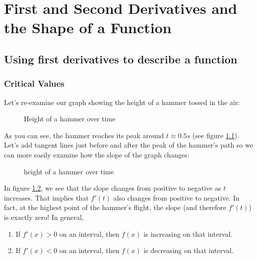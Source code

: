 \chapter{First and Second Derivatives and the Shape of a Function}
\section{Using first derivatives to describe a function}
\subsection{Critical Values}

Let's re-examine our graph showing the height of a hammer tossed in the air:


\begin{figure}
\centering
{}
\caption{Height of a hammer over time}
\label{ref:hammerh}
\end{figure}


As you can see, the hammer reaches its peak around $t \approx 0.5s$ (see figure \ref{ref:hammerh}). Let's add tangent lines just before and after the peak of the hammer's path so we can more easily examine how the slope of the graph changes:

\begin{figure}
\centering
{}
\caption{height of a hammer over time}
\label{ref:hammerh2}
\end{figure}


In figure \ref{ref:hammerh2}, we see that the slope changes from positive to negative as $t$ increases. That implies that $f'(t)$ also changes from positive to negative. In fact, at the highest point of the hammer's flight, the slope (and therefore $f'(t)$) is exactly zero! In general, 
\begin{enumerate}
	\item If $f'(x)>0$ on an interval, then $f(x)$ is increasing on that interval.
	\item If $f'(x)<0$ on an interval, then $f(x)$ is decreasing on that interval. 
\end{enumerate}


